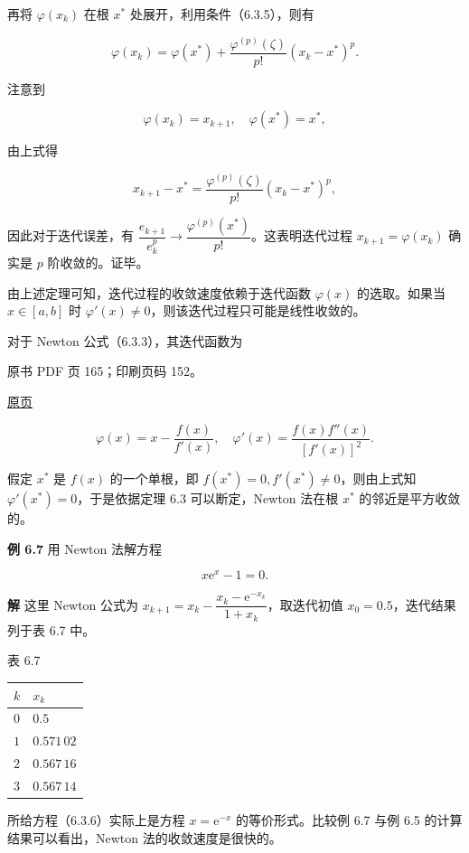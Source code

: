 再将 \(\varphi(x_k)\) 在根 \(x^*\) 处展开，利用条件（6.3.5），则有

\[
\varphi(x_k)=\varphi(x^*)+\frac{\varphi^{(p)}(\zeta)}{p!}(x_k-x^*)^p.
\]

注意到

\[
\varphi(x_k)=x_{k+1},\quad\varphi(x^*)=x^*,
\]

由上式得

\[
x_{k+1}-x^*=\frac{\varphi^{(p)}(\zeta)}{p!}(x_k-x^*)^p,
\]

因此对于迭代误差，有 \(\dfrac{e_{k+1}}{e_k^p}\to\dfrac{\varphi^{(p)}(x^*)}{p!}\)。这表明迭代过程 \(x_{k+1}=\varphi(x_k)\) 确实是 \(p\) 阶收敛的。证毕。

由上述定理可知，迭代过程的收敛速度依赖于迭代函数 \(\varphi(x)\) 的选取。如果当 \(x\in[a,b]\) 时 \(\varphi'(x)\ne0\)，则该迭代过程只可能是线性收敛的。

对于 Newton 公式（6.3.3），其迭代函数为

\clearpage

原书 PDF 页 165；印刷页码 152。

\href{source-images/pdf-165.jpeg}{原页}

\[
\varphi(x)=x-\frac{f(x)}{f'(x)},\quad\varphi'(x)=\frac{f(x)f''(x)}{[f'(x)]^2}.
\]

假定 \(x^*\) 是 \(f(x)\) 的一个单根，即 \(f(x^*)=0,f'(x^*)\ne0\)，则由上式知 \(\varphi'(x^*)=0\)，于是依据定理 6.3 可以断定，Newton 法在根 \(x^*\) 的邻近是平方收敛的。

\textbf{例 6.7} 用 Newton 法解方程

\[
x\mathrm{e}^x-1=0.
\tag{6.3.6}
\]

\textbf{解} 这里 Newton 公式为 \(x_{k+1}=x_k-\dfrac{x_k-\mathrm{e}^{-x_k}}{1+x_k}\)，取迭代初值 \(x_0=0.5\)，迭代结果列于表 6.7 中。

表 6.7

{\def\LTcaptype{none} %
\begin{longtable}[]{@{}ll@{}}
\toprule\noalign{}
\(k\) & \(x_k\) \\
\midrule\noalign{}
\endhead
\bottomrule\noalign{}
\endlastfoot
\(0\) & \(0.5\) \\
\(1\) & \(0.571\,02\) \\
\(2\) & \(0.567\,16\) \\
\(3\) & \(0.567\,14\) \\
\end{longtable}
}

所给方程（6.3.6）实际上是方程 \(x=\mathrm{e}^{-x}\) 的等价形式。比较例 6.7 与例 6.5 的计算结果可以看出，Newton 法的收敛速度是很快的。

